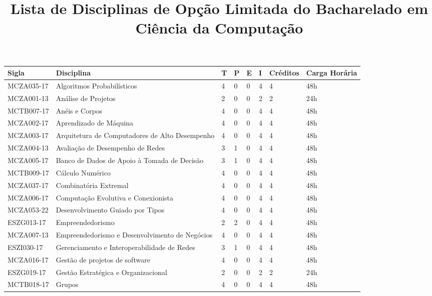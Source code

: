 \documentclass[a4paper]{article}
\title{Lista de Disciplinas de Opção Limitada do Bacharelado em Ciência da Computação}
\author{}
\date{}
\begin{document}
\maketitle

\begin{longtable}{|l|l|llll|l|l|}\hline\endhead\hline\endfoot
\textbf{Sigla} & \textbf{Disciplina} & \textbf{T} & \textbf{P} & \textbf{E} & \textbf{I} & \textbf{Créditos} & \textbf{Carga Horária} \\ \hline\hline
%
MCZA035-17 & Algoritmos Probabilísticos & 4 & 0 & 0 & 4 & 4 & 48h \\
MCZA001-13 & Análise de Projetos & 2 & 0 & 0 & 2 & 2 & 24h \\
MCTB007-17 & Anéis e Corpos & 4 & 0 & 0 & 4 & 4 & 48h \\
MCZA002-17 & Aprendizado de Máquina & 4 & 0 & 0 & 4 & 4 & 48h \\
MCZA003-17 & Arquitetura de Computadores de Alto Desempenho & 4 & 0 & 0 & 4 & 4 & 48h \\
MCZA004-13 & Avaliação de Desempenho de Redes & 3 & 1 & 0 & 4 & 4 & 48h \\
MCZA005-17 & Banco de Dados de Apoio à Tomada de Decisão & 3 & 1 & 0 & 4 & 4 & 48h \\
MCTB009-17 & Cálculo Numérico & 4 & 0 & 0 & 4 & 4 & 48h \\
MCZA037-17 & Combinatória Extremal & 4 & 0 & 0 & 4 & 4 & 48h \\
MCZA006-17 & Computação Evolutiva e Conexionista & 4 & 0 & 0 & 4 & 4 & 48h \\
MCZA053-22 & Desenvolvimento Guiado por Tipos & 4 & 0 & 0 & 4 & 4 & 48h \\
ESZG013-17 & Empreendedorismo & 2 & 2 & 0 & 4 & 4 & 48h \\
MCZA007-13 & Empreendedorismo e Desenvolvimento de Negócios & 4 & 0 & 0 & 4 & 4 & 48h \\
ESZI030-17 & Gerenciamento e Interoperabilidade de Redes & 3 & 1 & 0 & 4 & 4 & 48h \\
MCZA016-17 & Gestão de projetos de software & 4 & 0 & 0 & 4 & 4 & 48h \\
ESZG019-17 & Gestão Estratégica e Organizacional & 2 & 0 & 0 & 2 & 2 & 24h \\
MCTB018-17 & Grupos & 4 & 0 & 0 & 4 & 4 & 48h \\

\end{longtable}
\end{document}
